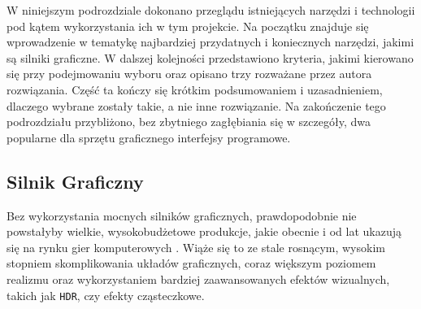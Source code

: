 \documentclass[11pt]{mwrep}
\begin{document}
    W niniejszym podrozdziale dokonano przeglądu istniejących narzędzi i technologii pod kątem wykorzystania ich w tym projekcie. Na początku znajduje się wprowadzenie w tematykę najbardziej przydatnych i koniecznych narzędzi, jakimi są silniki graficzne. W dalszej kolejności przedstawiono kryteria, jakimi kierowano się przy podejmowaniu wyboru oraz opisano trzy rozważane przez autora rozwiązania. Część ta kończy się krótkim podsumowaniem i uzasadnieniem, dlaczego wybrane zostały takie, a nie inne rozwiązanie. Na zakończenie tego podrozdziału przybliżono, bez zbytniego zagłębiania się w szczegóły, dwa popularne dla sprzętu graficznego interfejsy programowe.


    \subsection{Silnik Graficzny}

    Bez wykorzystania mocnych silników graficznych, prawdopodobnie nie powstałyby wielkie, wy\-so\-ko\-bud\-że\-to\-we produkcje, jakie obecnie i od lat ukazują się na rynku gier komputerowych . Wiąże się to ze stale rosnącym, wysokim stopniem skomplikowania układów graficznych, coraz większym poziomem realizmu oraz wykorzystaniem bardziej zaawansowanych efektów wizualnych, takich jak \texttt{HDR}, czy efekty cząsteczkowe.

\end{document}
